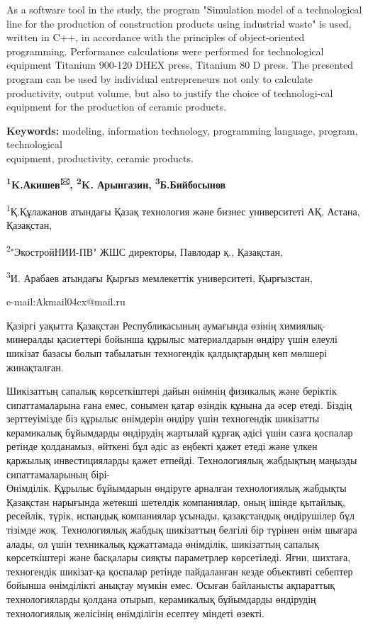 As a software tool in the study, the program "Simulation model of a
technological line for the production of construction products using
industrial waste" is used, written in C++, in accordance with the
principles of object-oriented programming. Performance calculations were
performed for technological equipment Titanium 900-120 DHEX press,
Titanium 80 D press. The presented program can be used by individual
entrepreneurs not only to calculate productivity, output volume, but
also to justify the choice of technologi-cal equipment for the production
of ceramic products.

{\bfseries Keywords:} modeling, information technology, programming
language, program, technological \\equipment, productivity, ceramic
products.


\begin{center}
{\bfseries \textsuperscript{1}K.Акишев\textsuperscript{🖂},
\textsuperscript{2}K. Арынгазин, \textsuperscript{3}Б.Бийбосынов}

\textsuperscript{1}Қ.Құлажанов атындағы Қазақ технология және бизнес
университеті АҚ, Астана, Қазақстан,

\textsuperscript{2}"ЭкостройНИИ-ПВ" ЖШС директоры, Павлодар қ.,
Қазақстан,

\textsuperscript{3}И. Арабаев атындағы Қырғыз мемлекеттік университеті,
Қырғызстан,

e-mail:Akmail04cx@mail.ru
\end{center}

Қазіргі уақытта Қазақстан Республикасының аумағында өзінің
химиялық-минералды қасиеттері бойынша құрылыс материалдарын өндіру үшін
елеулі шикізат базасы болып табылатын техногендік қалдықтардың көп
мөлшері жинақталған.

Шикізаттың сапалық көрсеткіштері дайын өнімнің физикалық және беріктік
сипаттамаларына ғана емес, сонымен қатар өзіндік құнына да әсер етеді.
Біздің зерттеуімізде біз құрылыс өнімдерін өндіру үшін техногендік
шикізатты керамикалық бұйымдарды өндірудің жартылай құрғақ әдісі үшін
сазға қоспалар ретінде қолданамыз, өйткені бұл әдіс аз еңбекті қажет
етеді және үлкен қаржылық инвестицияларды қажет етпейді. Технологиялық
жабдықтың маңызды сипаттамаларының бірі-\\Өнімділік. Құрылыс бұйымдарын
өндіруге арналған технологиялық жабдықты Қазақстан нарығында жетекші
шетелдік компаниялар, оның ішінде қытайлық, ресейлік, түрік, испандық
компаниялар ұсынады, қазақстандық өндірушілер бұл тізімде жоқ.
Технологиялық жабдық шикізаттың белгілі бір түрінен өнім шығара алады,
ол үшін техникалық құжаттамада өнімділік, шикізаттың сапалық
көрсеткіштері және басқалары сияқты параметрлер көрсетіледі. Яғни,
шихтаға, техногендік шикізат-қа қоспалар ретінде пайдаланған кезде
объективті себептер бойынша өнімділікті анықтау мүмкін емес. Осыған
байланысты ақпараттық технологияларды қолдана отырып, керамикалық
бұйымдарды өндірудің технологиялық желісінің өнімділігін есептеу міндеті
өзекті.

